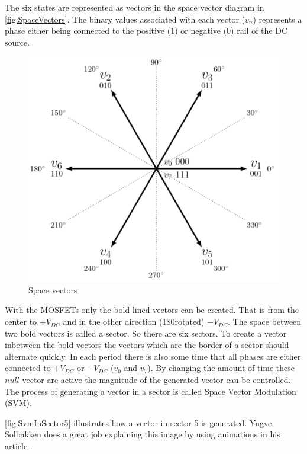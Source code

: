 \documentclass[]{report}
\begin{document}
The six states are represented as vectors in the space vector diagram in \autoref{fig:SpaceVectors}. The binary values associated with each vector ($v_n$) represents a phase either being connected to the positive (1) or negative (0) rail of the DC source.

\begin{figure}[H]
	\centering
	\includegraphics[width=0.75\linewidth]{Basic-Vectors.png}
	\caption{Space vectors \cite{SVPWM_animations}}
	\label{fig:SpaceVectors}
\end{figure}

With the MOSFETs only the bold lined vectors can be created. That is from the center to $+V_{DC}$ and in the other direction (180\degree rotated) $-V_{DC}$. The space between two bold vectors is called a sector. So there are six sectors. To create a vector inbetween the bold vectors the vectors which are the border of a sector should alternate quickly. In each period there is also some time that all phases are either connected to $+V_{DC}$ or $-V_{DC}$ ($v_0$ and $v_7$). By changing the amount of time these $null$ vector are active the magnitude of the generated vector can be controlled. The process of generating a vector in a sector is called Space Vector Modulation (SVM).

\autoref{fig:SvmInSector5} illustrates how a vector in sector 5 is generated. Yngve Solbakken does a great job explaining this image by using animations in his article \cite{SVPWM_animations}.
\end{document}
